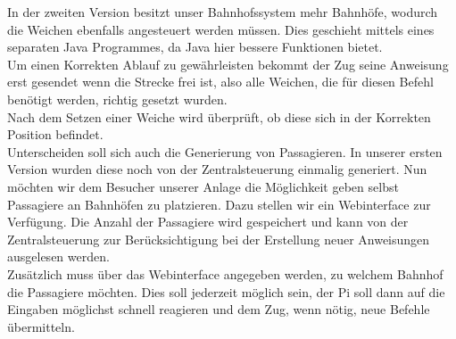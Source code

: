 In der zweiten Version besitzt unser Bahnhofssystem mehr Bahnhöfe, wodurch die Weichen ebenfalls angesteuert werden müssen. Dies geschieht mittels eines separaten Java Programmes, da Java hier bessere Funktionen bietet.\\
Um einen Korrekten Ablauf zu gewährleisten bekommt der Zug seine Anweisung erst gesendet wenn die Strecke frei ist, also alle Weichen, die für diesen Befehl benötigt werden, richtig gesetzt wurden.\\
Nach dem Setzen einer Weiche wird überprüft, ob diese sich in der Korrekten Position befindet.\\
Unterscheiden soll sich auch die Generierung von Passagieren. In unserer ersten Version wurden diese noch von der Zentralsteuerung einmalig generiert. Nun möchten wir dem Besucher unserer Anlage die Möglichkeit geben selbst Passagiere an Bahnhöfen zu platzieren. Dazu stellen wir ein Webinterface zur Verfügung. Die Anzahl der Passagiere wird gespeichert und kann von der Zentralsteuerung zur Berücksichtigung bei der Erstellung neuer Anweisungen ausgelesen werden.\\
Zusätzlich muss über das Webinterface angegeben werden, zu welchem Bahnhof die Passagiere möchten. Dies soll jederzeit möglich sein, der Pi soll dann auf die Eingaben möglichst schnell reagieren und dem Zug, wenn nötig, neue Befehle übermitteln.
